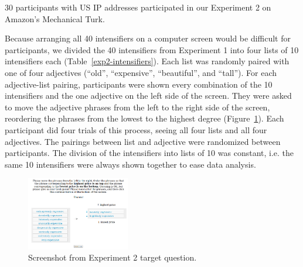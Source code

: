 \documentclass[10pt,letterpaper]{article}
\begin{document}
30 participants with US IP addresses participated in our Experiment 2 on Amazon's Mechanical Turk.

Because arranging all 40 intensifiers on a computer screen would be difficult for participants, we divided the 40 intensifiers from Experiment 1 into four lists of 10 intensifiers each (Table~\ref{exp2-intensifiers}).
Each list was randomly paired with one of four adjectives (``old'', ``expensive'', ``beautiful'', and ``tall'').
For each adjective-list pairing, participants were shown every combination of the 10 intensifiers and the one adjective on the left side of the screen.
They were asked to move the adjective phrases from the left to the right side of the screen, reordering the phrases from the lowest to the highest degree (Figure~\ref{exp2-q}).
Each participant did four trials of this process, seeing all four lists and all four adjectives.
The pairings between list and adjective were randomized between participants.
The division of the intensifiers into lists of 10 was constant, i.e. the same 10 intensifiers were always shown together to ease data analysis.

\begin{figure}[ht]
\begin{center}
\includegraphics[width=0.4\textwidth]{analysis_files_for_writeup/images/exp2-q.png}
\end{center}
\caption{Screenshot from Experiment 2 target question.} 
\label{exp2-q}
\end{figure}
\end{document}

